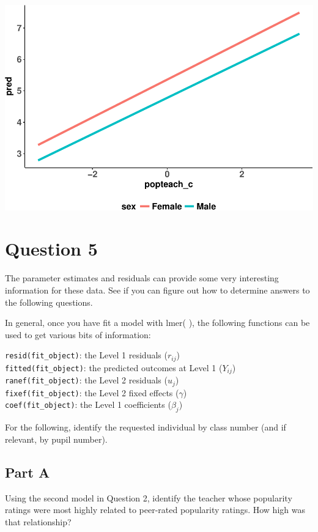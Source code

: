 \documentclass[]{article}
\begin{document}
\includegraphics{Beck_HW_3_R_1_files/figure-latex/unnamed-chunk-2-1.pdf}

\section{Question 5}\label{question-5}

The parameter estimates and residuals can provide some very interesting
information for these data. See if you can figure out how to determine
answers to the following questions.

In general, once you have fit a model with lmer( ), the following
functions can be used to get various bits of information:

\texttt{resid(fit\_object)}: the Level 1 residuals (\(r_{ij}\))\\
\texttt{fitted(fit\_object)}: the predicted outcomes at Level 1
(\(Y_{ij}\))\\
\texttt{ranef(fit\_object)}: the Level 2 residuals (\(u_j\))\\
\texttt{fixef(fit\_object)}: the Level 2 fixed effects (\(\gamma\))\\
\texttt{coef(fit\_object)}: the Level 1 coefficients (\(\beta_j\))

For the following, identify the requested individual by class number
(and if relevant, by pupil number).

\subsection{Part A}\label{part-a-4}

Using the second model in Question 2, identify the teacher whose
popularity ratings were most highly related to peer-rated popularity
ratings. How high was that relationship?
\end{document}
